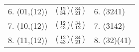 \documentclass{surv-l}
\numberwithin{equation}{section}
\numberwithin{table}{section}
\numberwithin{figure}{section}
\theoremstyle{plain}
\theoremstyle{definition}
\begin{document}
\begin{table}
{\begin{tabular}{|l|c|l|}
6. (01,(12))&$\big(\kern0.5pt\begin{smallmatrix}12\\ 34\end{smallmatrix}\kern0.5pt\big) \big(\kern0.5pt\begin{smallmatrix}34\\ 21\end{smallmatrix}\kern0.5pt\big)$&6. (3241)\\[3pt]
7. (10,(12))&$\big(\kern0.5pt\begin{smallmatrix}12\\ 43\end{smallmatrix}\kern0.5pt\big) \big(\kern0.5pt\begin{smallmatrix}34\\ 12\end{smallmatrix}\kern0.5pt\big)$&7. (3142)\\[3pt]
8. (11,(12)) &$\big(\kern0.5pt\begin{smallmatrix}12\\ 43\end{smallmatrix}\kern0.5pt\big) \big(\kern0.5pt\begin{smallmatrix}34\\ 21\end{smallmatrix}\kern0.5pt\big)$&8. (32)(41) \\[3pt]
\hline
\end{tabular}}{}
\end{table}
\end{document}

